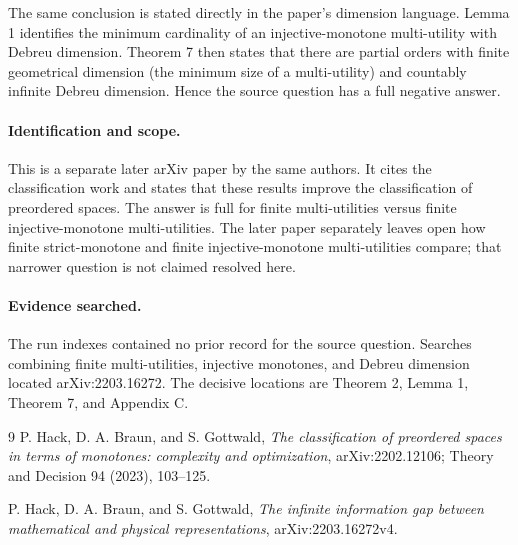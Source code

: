 \documentclass[10pt]{article}
\begin{document}
The same conclusion is stated directly in the paper's dimension language. Lemma 1 identifies the minimum cardinality of an injective-monotone multi-utility with Debreu dimension. Theorem 7 then states that there are partial orders with finite geometrical dimension (the minimum size of a multi-utility) and countably infinite Debreu dimension. Hence the source question has a full negative answer.

\paragraph{Identification and scope.}
This is a separate later arXiv paper by the same authors. It cites the classification work and states that these results improve the classification of preordered spaces. The answer is full for finite multi-utilities versus finite injective-monotone multi-utilities. The later paper separately leaves open how finite strict-monotone and finite injective-monotone multi-utilities compare; that narrower question is not claimed resolved here.

\paragraph{Evidence searched.}
The run indexes contained no prior record for the source question. Searches combining finite multi-utilities, injective monotones, and Debreu dimension located arXiv:2203.16272. The decisive locations are Theorem 2, Lemma 1, Theorem 7, and Appendix C.

\begin{thebibliography}{9}
P. Hack, D. A. Braun, and S. Gottwald,
\emph{The classification of preordered spaces in terms of monotones: complexity and optimization},
arXiv:2202.12106; Theory and Decision 94 (2023), 103--125.

P. Hack, D. A. Braun, and S. Gottwald,
\emph{The infinite information gap between mathematical and physical representations},
arXiv:2203.16272v4.
\end{thebibliography}
\end{document}

